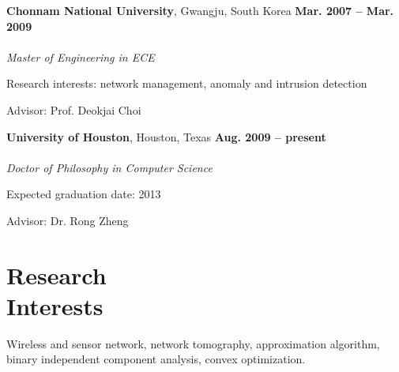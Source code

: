 \documentclass[margin,line]{resume}
\begin{document}
\begin{resume}
    \textbf{Chonnam National University}, Gwangju, South Korea
    \hfill \textbf{ Mar. 2007 -- Mar. 2009}\vspace{-3mm}\\\vspace{-1mm}%
    \\\vspace{1mm}%
    \textsl{Master of Engineering in ECE}
    \begin{list2}
        \item Research interests: network management, anomaly and intrusion detection
        \item Advisor:  Prof. Deokjai Choi
    \end{list2}\vspace{-1.5mm}

    \textbf{University of Houston}, Houston, Texas
    \hfill \textbf{ Aug. 2009 -- present}\vspace{-3mm}\\\vspace{-1mm}%
    \\\vspace{1mm}%
    \textsl{Doctor of Philosophy in Computer Science}
    \begin{list2}
        \item Expected graduation date: 2013
        \item Advisor:  Dr. Rong Zheng
    \end{list2}%


    \section{\mysidestyle Research\\Interests}

    Wireless and sensor network, network tomography, approximation algorithm, binary independent component analysis, convex optimization.\vspace{-1.5mm}




\end{resume}
\end{document}
